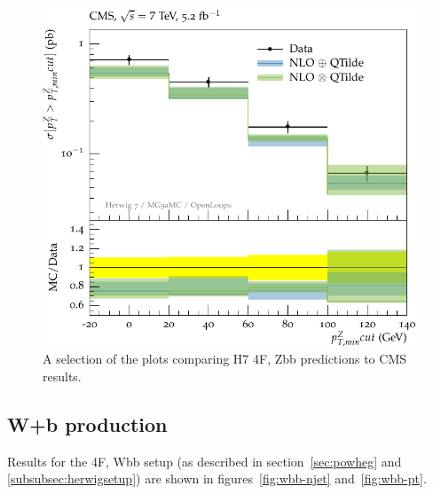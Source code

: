 \documentclass[11pt]{cernrep}
\newcommand{\Herwig}{H\protect\scalebox{0.8}{ERWIG}7\xspace}
\begin{document}
\begin{figure}[htbp]
   \includegraphics[scale=0.65]{figs/zbb/herwig4F/cms-d09-x01-y01.pdf} 
\caption{A selection of the plots comparing \Herwig 4F, Zbb predictions to CMS results.}
\label{zbb-herwig4F-cms-2}
\end{figure}





\subsection{W+b production \label{Wbb}}

Results for the 4F, Wbb setup (as described in
section~\ref{sec:powheg} and \ref{subsubsec:herwigsetup}) are shown in
figures~\ref{fig:wbb-njet} and~\ref{fig:wbb-pt}.
\end{document}
